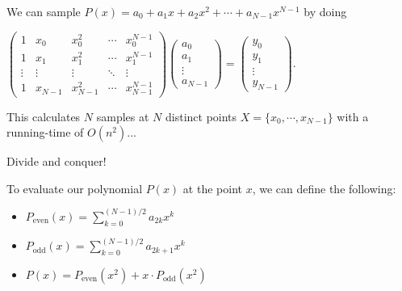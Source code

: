 \documentclass{beamer}
\begin{document}
\begin{frame}
	We can sample $P(x) = a_0+a_1x+a_2x^2+\cdots+a_{N-1}x^{N-1}$ by doing \\
	\bigskip
	\begin{centering}{
		$\begin{pmatrix}
			1 & x_0 & x_0^2 & \cdots & x_0^{N-1}\\ 
			1 & x_1 & x_1^2& \cdots & x_1^{N-1}\\ 
			\vdots & \vdots & \vdots & \ddots & \vdots\\ 
			1 & x_{N-1}  & x_{N-1}^{2}& \cdots & x_{N-1}^{N-1}
		\end{pmatrix}
		\begin{pmatrix}
			a_0\\ 
			a_1\\ 
			\vdots\\ 
			a_{N-1}
		\end{pmatrix}
		=
		\begin{pmatrix}
			y_0\\ 
			y_1\\ 
			\vdots\\ 
			y_{N-1}
		\end{pmatrix}$.
	}

\end{centering}

\bigskip
This calculates $N$ samples at $N$ distinct points $X = \{x_0,\cdots,x_{N-1}\}$ with a running-time of $O(n^2)$...
\end{frame}

\begin{frame}
Divide and conquer! 
\bigskip

To evaluate our polynomial $P(x)$ at the point $x$, we can define the following:
\begin{itemize}
\item{$P_{\text{even}}(x)=\displaystyle \sum_{k=0}^{(N-1)/2} a_{2k}x^k$}
\item{$P_{\text{odd}}(x)=\displaystyle \sum_{k=0}^{(N-1)/2} a_{2k+1}x^k$}
\item{$P(x) = P_{\text{even}}(x^2)+x\cdot P_{\text{odd}}(x^2)$}
\end{itemize}
\end{frame}

\begin{frame}

\end{frame}
\end{document}

